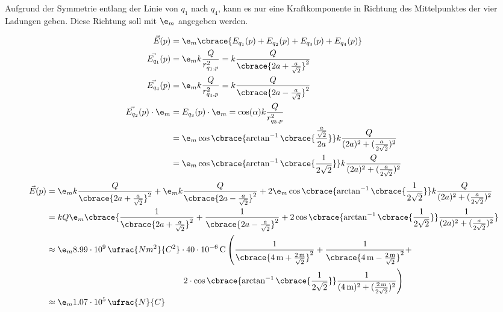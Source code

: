 \documentclass[11pt,letterpaper]{article}
\begin{document}
\begin{enumerate}
\begin{enumerate}
            Aufgrund der Symmetrie entlang der Linie von $q_1$ nach $q_4$, 
            kann es nur eine Kraftkomponente in Richtung des Mittelpunktes 
            der vier Ladungen geben. Diese Richtung soll mit $\e_m$ angegeben werden.

            \begin{align*}
                \vec{E}(p) &= \e_m\cbrace{E_{q_1}(p) + E_{q_2}(p) + E_{q_3}(p) + E_{q_4}(p)}\\
                \vec{E_{q_1}}(p) &= \e_m k \frac{Q}{r_{q_1,p}^2} = k \frac{Q}{\cbrace{2a + \frac{a}{\sqrt{2}}}^2}\\
                \vec{E_{q_4}}(p) &= \e_m k \frac{Q}{r_{q_4,p}^2} = k \frac{Q}{\cbrace{2a - \frac{a}{\sqrt{2}}}^2}\\
                \vec{E_{q_2}}(p) \cdot \e_m &= E_{q_3}(p) \cdot \e_m  
                = \cos(\alpha) k \frac{Q}{r_{q_3,p}^2} \\
                &= \e_m \cos\cbrace{\arctan^{-1}\cbrace{\frac{\frac{a}{\sqrt{2}}}{2a}}} k \frac{Q}{(2a)^2 + (\frac{a}{2\sqrt{2}})^2}\\
                &= \e_m \cos\cbrace{\arctan^{-1}\cbrace{\frac{1}{2\sqrt{2}}}} k \frac{Q}{(2a)^2 + (\frac{a}{2\sqrt{2}})^2}\\
            \end{align*} 
            \begin{align*}
                \vec{E}(p) &= \e_m k \frac{Q}{\cbrace{2a + \frac{a}{\sqrt{2}}}^2}
                +  \e_m k \frac{Q}{\cbrace{2a - \frac{a}{\sqrt{2}}}^2}
                + 2\e_m \cos\cbrace{\arctan^{-1}\cbrace{\frac{1}{2\sqrt{2}}}} k \frac{Q}{(2a)^2 + (\frac{a}{2\sqrt{2}})^2}\\
                &= k Q \e_m \cbrace{\frac{1}{\cbrace{2a + \frac{a}{\sqrt{2}}}^2}
                +  \frac{1}{\cbrace{2a - \frac{a}{\sqrt{2}}}^2}
                + 2 \cos\cbrace{\arctan^{-1}\cbrace{\frac{1}{2\sqrt{2}}}} \frac{1}{(2a)^2 + (\frac{a}{2\sqrt{2}})^2}}\\
                &\approx \e_m 8.99\cdot 10^{9}\, \ufrac{Nm^2}{C^2} \cdot 40\cdot 10^{-6} \, \mathrm{C} \left(\frac{1}{\cbrace{4\,\mathrm{m} + \frac{2\,\mathrm{m}}{\sqrt{2}}}^2}
                +  \frac{1}{\cbrace{4\,\mathrm{m} - \frac{2\,\mathrm{m}}{\sqrt{2}}}^2}+\right.\\
                &\qquad \qquad\qquad\qquad\qquad\qquad\qquad\qquad \left.2\cdot \cos\cbrace{\arctan^{-1}\cbrace{\frac{1}{2\sqrt{2}}}} \frac{1}{(4\,\mathrm{m})^2 + (\frac{2\,\mathrm{m}}{2\sqrt{2}})^2}\right)\\
                &\approx \e_m 1.07\cdot 10^{5}\,\ufrac{N}{C}\\
            \end{align*}


\end{enumerate}
\end{enumerate}
\end{document}
